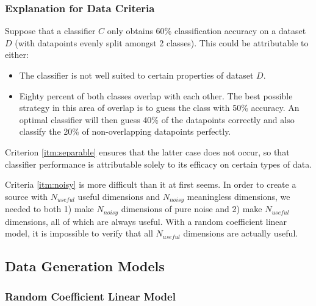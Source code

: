 \documentclass{article}
\begin{document}
\subsubsection*{Explanation for Data Criteria}

Suppose that a classifier $C$ only obtains 60\% classification accuracy on a
dataset $D$ (with datapoints evenly split amongst 2 classes). This could be
attributable to either:
\begin{itemize}
    \item The classifier is not well suited to certain properties of dataset $D$.
    \item Eighty percent of both classes overlap with each other. The best possible
        strategy in this area of overlap is to guess the class with 50\%
        accuracy. An optimal classifier will then guess 40\% of the datapoints
        correctly and also classify the 20\% of non-overlapping datapoints
        perfectly.
\end{itemize}
Criterion \ref{itm:separable} ensures that the latter case does not occur,
so that classifier performance is attributable solely to its efficacy on
certain types of data.

Criteria \ref{itm:noisy} is more difficult than it at first seems. In
order to create a source with $N_{useful}$ useful dimensions and $N_{noisy}$
meaningless dimensions, we needed to both 1) make $N_{noisy}$ dimensions of
pure noise and 2) make $N_{useful}$ dimensions, all of which are always useful.
With a random coefficient linear model, it is impossible to verify that all
$N_{useful}$ dimensions are actually useful.



\subsection*{Data Generation Models}

\subsubsection*{Random Coefficient Linear Model}
\end{document}
